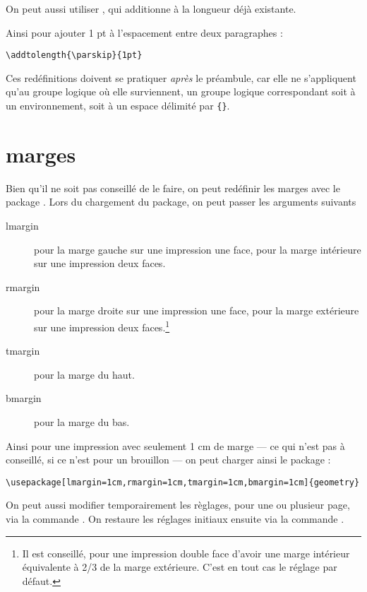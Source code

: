 On peut aussi utiliser , qui additionne  à la longueur déjà existante.

Ainsi pour ajouter 1 pt à l'espacement entre deux paragraphes :

\begin{verbatim}
\addtolength{\parskip}{1pt}
\end{verbatim}

Ces redéfinitions doivent se pratiquer \emph{après} le préambule, car elle ne s'appliquent qu'au groupe logique où elle surviennent, un groupe logique correspondant soit à un environnement, soit à un espace délimité par \verb|{}|.

\section{marges}

Bien qu'il ne soit pas conseillé de le faire, on peut redéfinir les marges avec le package . Lors du chargement du package, on peut passer les arguments suivants
\begin{description}
\item[lmargin]pour la marge gauche sur une impression une face, pour la marge intérieure sur une impression deux faces.
\item[rmargin]pour la marge droite sur une impression une face, pour la marge extérieure sur une impression deux faces.\footnote{Il est conseillé, pour une impression double face d'avoir une marge intérieur équivalente à 2/3 de la marge extérieure. C'est en tout cas le réglage par défaut.}
\item[tmargin]pour la marge du haut.
\item[bmargin]pour la marge du bas.
\end{description}

Ainsi pour une impression avec seulement 1 cm de marge --- ce qui n'est pas à conseillé, si ce n'est pour un brouillon --- on peut charger ainsi le package :

\begin{verbatim}
\usepackage[lmargin=1cm,rmargin=1cm,tmargin=1cm,bmargin=1cm]{geometry}
\end{verbatim}

On peut aussi modifier temporairement les règlages, pour une ou plusieur page, via la commande . On restaure les réglages initiaux ensuite via la commande .

